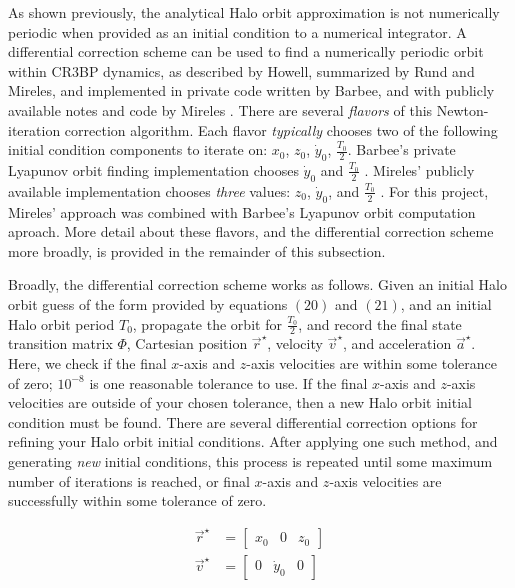 \documentclass[conf]{new-aiaa}
\begin{document}
\begin{multicols}{2}
As shown previously, the analytical Halo orbit approximation is 
not numerically periodic when provided as an initial condition
to a numerical integrator. A differential correction scheme can 
be used to find a numerically periodic orbit within CR3BP dynamics, 
as described by Howell, summarized by Rund and Mireles, 
and implemented in private code written by Barbee, and
with publicly available notes and code by Mireles 
\cite{howell1984three} 
\cite{rund2018interplanetary}
\cite{barbeeCode}
\cite{mirelesNotes}
\cite{mirelesCode}.
There are several \textit{flavors} of this Newton-iteration correction algorithm. 
Each flavor \textit{typically} chooses two of the following initial condition
components to iterate on: $x_0$, $z_0$, $\dot{y}_0$, $\frac{T_0}{2}$.
Barbee's private Lyapunov orbit finding implementation chooses 
$\dot{y}_0$ and $\frac{T_0}{2}$ \cite{barbeeCode}.
Mireles' publicly available implementation chooses \textit{three} 
values: $z_0$, $\dot{y}_0$, and $\frac{T_0}{2}$ \cite{mirelesCode}. 
For this project, Mireles'
approach was combined with Barbee's Lyapunov orbit computation aproach. 
More detail about these flavors, and the differential
correction scheme more broadly, is provided in the remainder of this subsection. 

Broadly, the differential correction scheme works as follows.
Given an initial Halo orbit guess of the form provided by equations 
$\left(20\right)$ and $\left(21\right)$, and an initial Halo orbit
period $T_0$, propagate the orbit for $\frac{T_0}{2}$, and record
the final state transition matrix $\Phi$, 
Cartesian position $\overrightarrow{r}^{\star}$, 
velocity $\overrightarrow{v}^{\star}$, and acceleration
$\overrightarrow{a}^{\star}$. Here, we check if 
the final $x$-axis and $z$-axis velocities are within some tolerance of zero; 
$10^{-8}$ is one reasonable tolerance to use. If the final $x$-axis and $z$-axis
velocities are outside of your chosen tolerance, then a new Halo orbit
initial condition must be found. There are several differential correction 
options for refining your Halo orbit initial conditions. After 
applying one such method, and generating \textit{new} initial conditions, 
this process is repeated until some maximum number of iterations 
is reached, or final $x$-axis and $z$-axis velocities are successfully
within some tolerance of zero. 

\begin{align}
    \overrightarrow{r}^{\star} &= \begin{bmatrix} x_0 & 0 & z_0 \end{bmatrix} \\
    \overrightarrow{v}^{\star} &= \begin{bmatrix} 0 & \dot{y}_0 & 0 \end{bmatrix}
\end{align}


\end{multicols}
\end{document}
